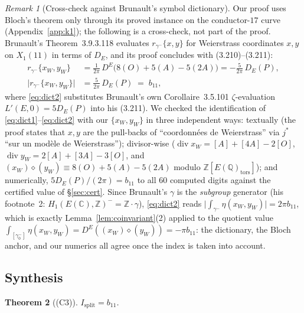 \documentclass[preprint,12pt]{elsarticle}
\newtheorem{theorem}{Theorem}[section]
\theoremstyle{definition}
\theoremstyle{remark}
\newtheorem{remark}[theorem]{Remark}
\newcommand{\Q}{\mathbb{Q}}
\newcommand{\Z}{\mathbb{Z}}
\newcommand{\C}{\mathbb{C}}
\DeclareMathOperator{\divisor}{div}
\begin{document}
\begin{remark}[Cross-check against Brunault's symbol dictionary]
\label{rem:brunault-dict}
Our proof uses Bloch's theorem only through its proved instance on the
conductor-$17$ curve (Appendix~\ref{app:k1}); the following is a
cross-check, not part of the proof.
Brunault's Theorem~3.9.3.118 \cite{Brunault} evaluates
$r_{\gamma^-}\{x,y\}$ for Weierstrass coordinates $x,y$ on $X_1(11)$ in
terms of $D_E$, and its proof concludes with (3.210)--(3.211):
\begin{align}
  r_{\gamma^-}\{x_W,y_W\}
  &=\frac{1}{2\pi}\,D^E\bigl(8(O)+5(A)-5(2A)\bigr)
  =-\frac{5}{2\pi}\,D_E(P),\label{eq:dict1}\\
  \bigl|r_{\gamma^-}\{x_W,y_W\}\bigr|
  &=\frac{5}{2\pi}\,D_E(P)\;=\;b_{11},\label{eq:dict2}
\end{align}
where \eqref{eq:dict2} substitutes Brunault's own Corollaire~3.5.101
$\zeta$-evaluation $L'(E,0)=5D_E(P)$ \cite[(3.151)]{Brunault} into his
(3.211). We checked the identification of
\eqref{eq:dict1}--\eqref{eq:dict2} with our $\{x_W,y_W\}$ in three
independent ways: textually (the proof states that $x,y$ are the pull-backs
of ``coordonn\'ees de Weierstrass'' via $j^*$ ``sur un mod\`ele de
Weierstrass''); divisor-wise ($\divisor x_W=[A]+[4A]-2[O]$,
$\divisor y_W=2[A]+[3A]-3[O]$, and
$(x_W)\diamond(y_W)\equiv 8(O)+5(A)-5(2A)$ modulo $\Z[E(\Q)_{\mathrm{tors}}]$); and
numerically, $5D_E(P)/(2\pi)=b_{11}$ to all $60$ computed digits against
the certified value of \S\ref{sec:cert}. Since Brunault's $\gamma$ is the \emph{subgroup} generator
(his footnote~2: $H_1(E(\C),\Z)^-=\Z\cdot\gamma$), \eqref{eq:dict2}
reads $\bigl|\int_{\gamma^-}\eta(x_W,y_W)\bigr|=2\pi b_{11}$, which is
exactly Lemma~\ref{lem:coinvariant}(2) applied to the quotient value
$\int_{[\gamma^-_0]}\eta(x_W,y_W)=D^E((x_W)\diamond(y_W))=-\pi b_{11}$: the
dictionary, the Bloch anchor, and our numerics all agree once the index is
taken into account.
\end{remark}

\subsection{Synthesis}

\begin{theorem}[(C3)]\label{thm:C3}
$I_{\mathrm{split}}=b_{11}$.
\end{theorem}
\end{document}
